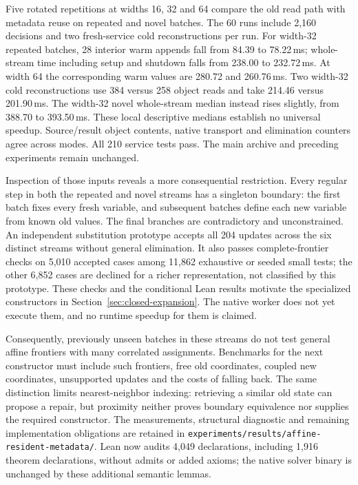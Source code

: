\documentclass[11pt,a4paper]{article}
\numberwithin{equation}{section}
\theoremstyle{plain}
\theoremstyle{definition}
\theoremstyle{remark}
\begin{document}
Five rotated repetitions at widths 16, 32 and 64 compare the old read path with metadata reuse on repeated and novel batches. The 60 runs include 2,160 decisions and two fresh-service cold reconstructions per run. For width-32 repeated batches, 28 interior warm appends fall from 84.39 to 78.22\,ms; whole-stream time including setup and shutdown falls from 238.00 to 232.72\,ms. At width 64 the corresponding warm values are 280.72 and 260.76\,ms. Two width-32 cold reconstructions use 384 versus 258 object reads and take 214.46 versus 201.90\,ms. The width-32 novel whole-stream median instead rises slightly, from 388.70 to 393.50\,ms. These local descriptive medians establish no universal speedup. Source/result object contents, native transport and elimination counters agree across modes. All 210 service tests pass. The main archive and preceding experiments remain unchanged.

Inspection of those inputs reveals a more consequential restriction. Every regular step in both the repeated and novel streams has a singleton boundary: the first batch fixes every fresh variable, and subsequent batches define each new variable from known old values. The final branches are contradictory and unconstrained. An independent substitution prototype accepts all 204 updates across the six distinct streams without general elimination. It also passes complete-frontier checks on 5,010 accepted cases among 11,862 exhaustive or seeded small tests; the other 6,852 cases are declined for a richer representation, not classified by this prototype. These checks and the conditional Lean results motivate the specialized constructors in Section~\ref{sec:closed-expansion}. The native worker does not yet execute them, and no runtime speedup for them is claimed.

Consequently, previously unseen batches in these streams do not test general affine frontiers with many correlated assignments. Benchmarks for the next constructor must include such frontiers, free old coordinates, coupled new coordinates, unsupported updates and the costs of falling back. The same distinction limits nearest-neighbor indexing: retrieving a similar old state can propose a repair, but proximity neither proves boundary equivalence nor supplies the required constructor. The measurements, structural diagnostic and remaining implementation obligations are retained in \texttt{experiments/results/affine-resident-metadata/}. Lean now audits 4,049 declarations, including 1,916 theorem declarations, without admits or added axioms; the native solver binary is unchanged by these additional semantic lemmas.
\end{document}
